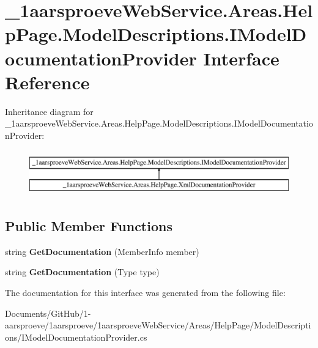 \hypertarget{interface__1aarsproeve_web_service_1_1_areas_1_1_help_page_1_1_model_descriptions_1_1_i_model_documentation_provider}{}\section{\+\_\+1aarsproeve\+Web\+Service.\+Areas.\+Help\+Page.\+Model\+Descriptions.\+I\+Model\+Documentation\+Provider Interface Reference}
\label{interface__1aarsproeve_web_service_1_1_areas_1_1_help_page_1_1_model_descriptions_1_1_i_model_documentation_provider}
Inheritance diagram for \+\_\+1aarsproeve\+Web\+Service.\+Areas.\+Help\+Page.\+Model\+Descriptions.\+I\+Model\+Documentation\+Provider\+:\begin{figure}[H]
\begin{center}
\leavevmode
\includegraphics[height=2.000000cm]{interface__1aarsproeve_web_service_1_1_areas_1_1_help_page_1_1_model_descriptions_1_1_i_model_documentation_provider}
\end{center}
\end{figure}
\subsection*{Public Member Functions}
\begin{DoxyCompactItemize}
\item 
\hypertarget{interface__1aarsproeve_web_service_1_1_areas_1_1_help_page_1_1_model_descriptions_1_1_i_model_documentation_provider_a2b728d776da74168bd405ae202c11129}{}string {\bfseries Get\+Documentation} (Member\+Info member)\label{interface__1aarsproeve_web_service_1_1_areas_1_1_help_page_1_1_model_descriptions_1_1_i_model_documentation_provider_a2b728d776da74168bd405ae202c11129}

\item 
\hypertarget{interface__1aarsproeve_web_service_1_1_areas_1_1_help_page_1_1_model_descriptions_1_1_i_model_documentation_provider_a0c90877deffb5cdbfb8260caa8ab7411}{}string {\bfseries Get\+Documentation} (Type type)\label{interface__1aarsproeve_web_service_1_1_areas_1_1_help_page_1_1_model_descriptions_1_1_i_model_documentation_provider_a0c90877deffb5cdbfb8260caa8ab7411}

\end{DoxyCompactItemize}


The documentation for this interface was generated from the following file\+:\begin{DoxyCompactItemize}
\item 
Documents/\+Git\+Hub/1-\/aarsproeve/1aarsproeve/1aarsproeve\+Web\+Service/\+Areas/\+Help\+Page/\+Model\+Descriptions/I\+Model\+Documentation\+Provider.\+cs\end{DoxyCompactItemize}
